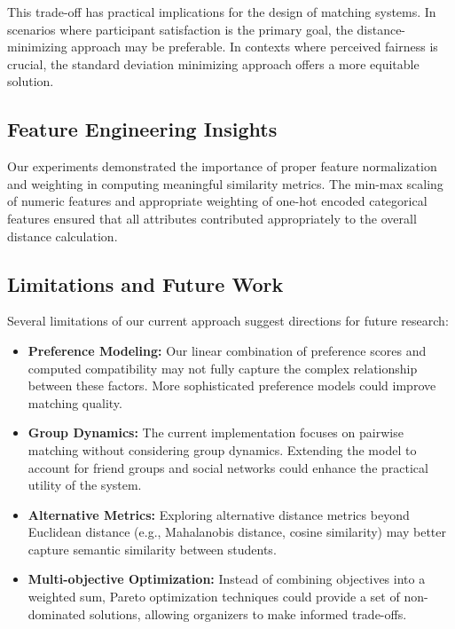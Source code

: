 \documentclass[10pt,journal,compsoc]{IEEEtran}
\begin{document}
This trade-off has practical implications for the design of matching systems. In scenarios where participant satisfaction is the primary goal, the distance-minimizing approach may be preferable. In contexts where perceived fairness is crucial, the standard deviation minimizing approach offers a more equitable solution.

\subsection{Feature Engineering Insights}
Our experiments demonstrated the importance of proper feature normalization and weighting in computing meaningful similarity metrics. The min-max scaling of numeric features and appropriate weighting of one-hot encoded categorical features ensured that all attributes contributed appropriately to the overall distance calculation.

\subsection{Limitations and Future Work}
Several limitations of our current approach suggest directions for future research:

\begin{itemize}
\item \textbf{Preference Modeling:} Our linear combination of preference scores and computed compatibility may not fully capture the complex relationship between these factors. More sophisticated preference models could improve matching quality.

\item \textbf{Group Dynamics:} The current implementation focuses on pairwise matching without considering group dynamics. Extending the model to account for friend groups and social networks could enhance the practical utility of the system.

\item \textbf{Alternative Metrics:} Exploring alternative distance metrics beyond Euclidean distance (e.g., Mahalanobis distance, cosine similarity) may better capture semantic similarity between students.

\item \textbf{Multi-objective Optimization:} Instead of combining objectives into a weighted sum, Pareto optimization techniques could provide a set of non-dominated solutions, allowing organizers to make informed trade-offs.
\end{itemize}
\end{document}
